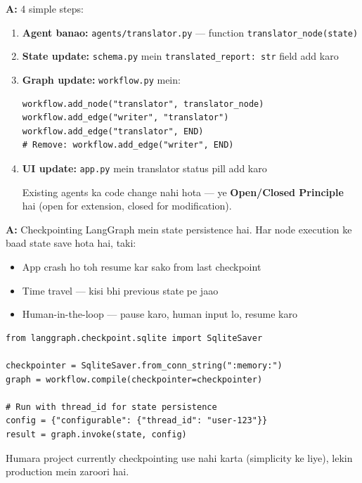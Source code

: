 \documentclass[12pt, a4paper]{article}
\begin{document}
\begin{interviewbox}[title={\faIcon{user-tie} ~Q15: Agar 6th agent add karna ho (e.g., Translator), toh kya changes karne padenge?}]
\textbf{A:} 4 simple steps:
\begin{enumerate}
\item \textbf{Agent banao:} \texttt{agents/translator.py} --- function \texttt{translator\_node(state)}
\item \textbf{State update:} \texttt{schema.py} mein \texttt{translated\_report: str} field add karo
\item \textbf{Graph update:} \texttt{workflow.py} mein:
\begin{lstlisting}[style=pythonstyle]
workflow.add_node("translator", translator_node)
workflow.add_edge("writer", "translator")
workflow.add_edge("translator", END)
# Remove: workflow.add_edge("writer", END)
\end{lstlisting}
\item \textbf{UI update:} \texttt{app.py} mein translator status pill add karo

Existing agents ka code change nahi hota --- ye \textbf{Open/Closed Principle} hai (open for extension, closed for modification).
\end{enumerate}
\end{interviewbox}

\begin{interviewbox}[title={\faIcon{user-tie} ~Q16: LangGraph mein checkpointing kya hai?}]
\textbf{A:} Checkpointing LangGraph mein state persistence hai. Har node execution ke baad state save hota hai, taki:
\begin{itemize}
\item App crash ho toh resume kar sako from last checkpoint
\item Time travel --- kisi bhi previous state pe jaao
\item Human-in-the-loop --- pause karo, human input lo, resume karo
\end{itemize}

\begin{lstlisting}[style=pythonstyle]
from langgraph.checkpoint.sqlite import SqliteSaver

checkpointer = SqliteSaver.from_conn_string(":memory:")
graph = workflow.compile(checkpointer=checkpointer)

# Run with thread_id for state persistence
config = {"configurable": {"thread_id": "user-123"}}
result = graph.invoke(state, config)
\end{lstlisting}

Humara project currently checkpointing use nahi karta (simplicity ke liye), lekin production mein zaroori hai.
\end{interviewbox}
\end{document}
